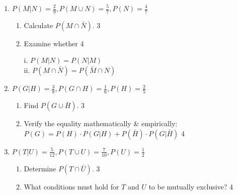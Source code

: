 \documentclass[a4paper,oneside, margin=1.4in]{book}
\begin{document}
\begin{enumerate}
\item \textbf{\( P(M \vert N) = \frac{2}{9}, P(M \cup N) = \frac{5}{7}, P(N) = \frac{4}{7} \)}

\begin{enumerate}
    \item Calculate \( P(M \cap \bar{N}) \). \hfill 3
    \item Examine whether   \hfill 4
    
    i. $P(M \vert N) = P(N \vert M)$ \\
    ii. $P(M \cap \bar N) = P(\bar M \cap N)$

\end{enumerate}

\item \textbf{\( P(G \vert H) = \frac{3}{8}, P(G \cap H) = \frac{1}{6}, P(H) = \frac{2}{5} \)}

\begin{enumerate}
    \item Find \( P(G \cup \bar{H}) \). \hfill 3
	\item Verify the equality mathematically \& empirically: \\ $P(G) = P(H) \cdot P(G \vert H) + P(\bar H) \cdot P(G \vert \bar H)$ \hfill 4
\end{enumerate}

\item \textbf{\( P(T \vert U) = \frac{5}{12}, P(T \cup U) = \frac{7}{10}, P(U) = \frac{1}{2} \)}

\begin{enumerate}
    \item Determine \( P(T \cap \bar{U}) \). \hfill 3
    \item What conditions must hold for \( T \) and \( U \) to be mutually exclusive? \hfill 4
\end{enumerate}



  \end{enumerate}
\end{document}
